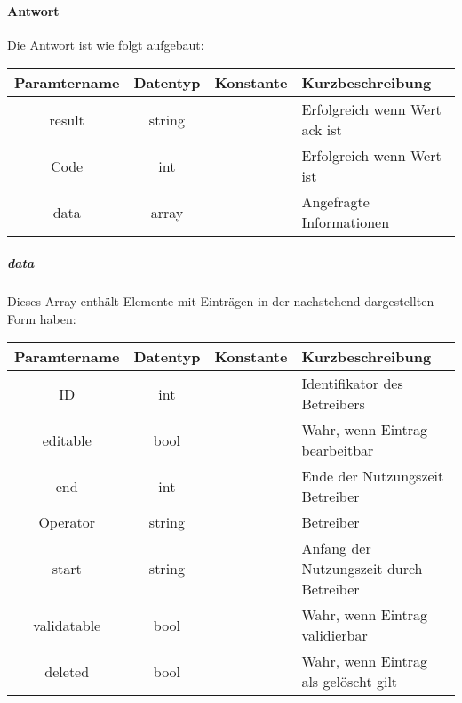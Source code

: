 \paragraph{Antwort}Die Antwort ist wie folgt aufgebaut:
\begin{table}[H]
	\begin{tabular}{|c|c|c|p{6.5cm}|}
		\hline
		\textbf{Paramtername} & \textbf{Datentyp} & \textbf{Konstante} & \textbf{Kurzbeschreibung}                                                                                               \\ \hline
		result              & string           &                 & Erfolgreich wenn Wert {\glqq ack\grqq} ist \\ \hline
		Code                & int              &                 & Erfolgreich wenn Wert {\glqq 0\grqq} ist \\ \hline
		data                & array            &                 & Angefragte Informationen \\ \hline
	\end{tabular}
\end{table}
\subparagraph{data}Dieses Array enthält Elemente mit Einträgen in der nachstehend dargestellten Form haben:
\begin{table}[H]
	\begin{tabular}{|c|c|c|p{6.5cm}|}
		\hline
		\textbf{Paramtername} & \textbf{Datentyp} & \textbf{Konstante} & \textbf{Kurzbeschreibung}    \\ \hline
		ID                     & int             &                 & Identifikator des Betreibers \\ \hline
		editable               & bool            &                 & Wahr, wenn Eintrag bearbeitbar \\ \hline
		end                    & int             &                 & Ende der Nutzungszeit Betreiber \\ \hline
		Operator               & string          &                 & Betreiber \\ \hline
		start                  & string          &                 & Anfang der Nutzungszeit durch Betreiber \\ \hline
		validatable            & bool            &                 & Wahr, wenn Eintrag validierbar \\ \hline
		deleted                & bool            &                 & Wahr, wenn Eintrag als gelöscht gilt \\ \hline
	\end{tabular}
\end{table}

